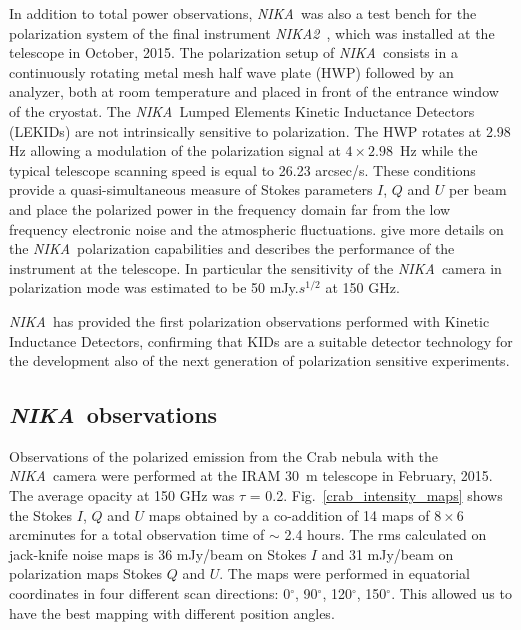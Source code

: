 \documentclass[twocolumn,traditabstract]{aa}
\def\NIKA{\textit{NIKA}}
\def\NIKAd{\textit{NIKA2}}
\begin{document}
In addition to total power observations, \NIKA\ was also a test
bench for the polarization system of the final instrument
\NIKAd\ \citep{calvo2016,catalano2016nika2,2017arXiv170700908A}, which was installed at the
telescope in October, 2015. The polarization setup of \NIKA\
consists in a continuously rotating metal mesh half wave plate (HWP)
followed by an analyzer, both at room temperature and placed in
front of the entrance window of the cryostat. The \NIKA\ Lumped Elements Kinetic
Inductance Detectors (LEKIDs) are not intrinsically sensitive to
polarization. The HWP rotates at 2.98 Hz allowing a modulation of the polarization signal at $4\times 2.98$~Hz while the typical telescope scanning speed is equal to 26.23 arcsec/s.
These conditions provide a quasi-simultaneous measure of Stokes parameters $I$, $Q$ and $U$
per beam and place the polarized power in the frequency domain far from the low frequency
electronic noise and the atmospheric fluctuations. \cite{ritacco2017} give more
details on the \NIKA\ polarization capabilities and describes the performance of
the instrument at the telescope. In particular the sensitivity of the
\NIKA\ camera in polarization mode was estimated to be 50 mJy.$s^{1/2}$ at 150
GHz.

\NIKA\ has provided the first polarization
observations performed with Kinetic Inductance Detectors, confirming that KIDs are a
suitable detector technology for the development also of the next generation of polarization sensitive
experiments.

\subsection{\NIKA\ observations}\label{sec:nika_observations}
Observations of the polarized emission from the Crab nebula with the \NIKA\ camera were performed at
the IRAM 30~m telescope in February, 2015. The average opacity at 150 GHz was $\tau$ = 0.2.  Fig.~\ref{crab_intensity_maps} shows
the Stokes $I$, $Q$ and $U$ maps obtained by a co-addition of 14 maps
of $8 \times 6$ arcminutes for a total observation time of $\sim$ 2.4 hours. The rms calculated on jack-knife noise maps is 36 mJy/beam on Stokes $I$ and 31 mJy/beam on polarization maps Stokes $Q$ and $U$.
The maps were performed in equatorial coordinates in four different scan
directions: 0$^{\circ}$, 90$^{\circ}$, 120$^{\circ}$, 150$^{\circ}$. This
allowed us to have the best mapping with different position angles.
\end{document}
